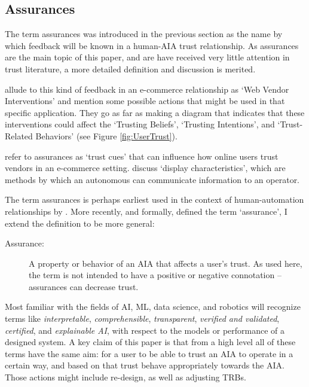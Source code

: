 \subsection{Assurances} \label{sec:assurances}
    The term assurances was introduced in the previous section as the name by which feedback will be known in a human-AIA trust relationship. As assurances are the main topic of this paper, and are have received very little attention in trust literature, a more detailed definition and discussion is merited.

    \citet{McKnight2001-fa} allude to this kind of feedback in an e-commerce relationship as `Web Vendor Interventions' and mention some possible actions that might be used in that specific application. They go as far as making a diagram that indicates that these interventions could affect the `Trusting Beliefs', `Trusting Intentions', and `Trust-Related Behaviors' (see Figure \ref{fig:UserTrust}).

    \citet{Corritore2003-gx} refer to assurances as `trust cues' that can influence how online users trust vendors in an e-commerce setting. \citet{Lee2004-pv} discuss `display characteristics', which are methods by which an autonomous can communicate information to an operator.
    
    The term assurances is perhaps earliest used in the context of human-automation relationships by \citet{Sheridan1984-kx}. More recently, and formally, \citet{Lillard2016-yg} defined the term `assurance', I extend the definition to be more general:
    
    \begin{description}
        \item [Assurance:] A property or behavior of an AIA that affects a user's trust. As used here, the term is not intended to have a positive or negative connotation -- assurances can decrease trust.
    \end{description}

    Most familiar with the fields of AI, ML, data science, and robotics will recognize terms like \emph{interpretable}, \emph{comprehensible}, \emph{transparent}, \emph{verified and validated}, \emph{certified}, and \emph{explainable AI}, with respect to the models or performance of a designed system. A key claim of this paper is that from a high level all of these terms have the same aim: for a user to be able to trust an AIA to operate in a certain way, and based on that trust behave appropriately towards the AIA. Those actions might include re-design, as well as adjusting TRBs.
%


